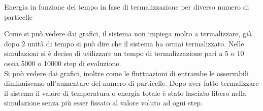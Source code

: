 \begin{myfig}[h]
	\caption{Energia in funzione del tempo in fase di termalizzazione per diverso numero di particelle}
\end{myfig}
Come si può vedere dai grafici, il sistema non impiega molto a termalizzare, già dopo 2 unità di tempo si può dire che il sistema ha ormai termalizzato.
Nelle simulazioni si è deciso di utilizzare un tempo di termalizzazione pari a 5 o 10 ossia 5000 o 10000 step di evoluzione.\\
Si può vedere dai grafici, inoltre come le fluttuazioni di entrambe le osservabili diminuiscano all'aumentare del numero di particelle.
Dopo aver fatto termalizzare il sistema il valore di temperatura o energia totale è stato lasciato libero nella simulazione senza più esser fissato al valore voluto ad ogni step.\\


